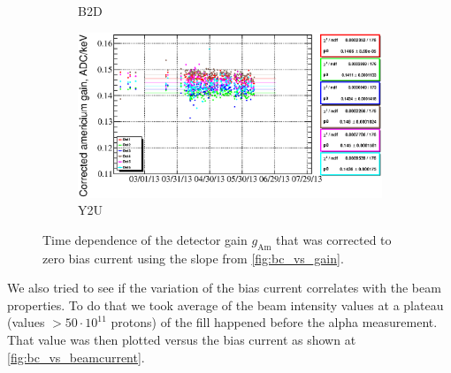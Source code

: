 \documentclass[a4paper,12pt]{article}
\begin{document}
\begin{figure}
\begin{subfigure}[t]{0.49\textwidth}
\caption{B2D}
\end{subfigure}
%
\hfill
%
\begin{subfigure}[t]{0.49\textwidth}
\includegraphics[width=\textwidth]{gfx/run13_alpha_study_novoltagevariation/Y2U/c_chAmGainCorrected_by_day_Y2U.eps}
\caption{Y2U}
\end{subfigure}
%
\caption{Time dependence of the detector gain $g_\text{Am}$ that was corrected
to zero bias current using the slope from \cref{fig:bc_vs_gain}.}
\label{fig:gainAmCorrected}
\end{figure}

We also tried to see if the variation of the bias current correlates with the
beam properties. To do that we took average of the beam intensity values at a
plateau (values $> 50 \cdot 10^{11}$ protons) of the fill happened before the
alpha measurement. That value was then plotted versus the bias current as
shown at \cref{fig:bc_vs_beamcurrent}.
\end{document}
